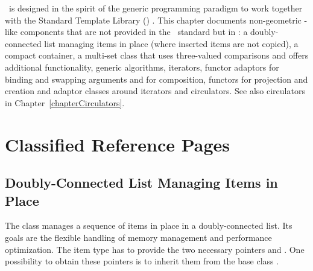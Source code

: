 
\label{chapterDataStructures}\label{chapterStlExtensions}





\cgal\ is designed in the spirit of the generic programming paradigm
to work together with the Standard Template Library (\stl)
\cite{cgal:ansi-is14882-98,cgal:a-gps-98}. This chapter documents non-geometric
\stl-like components that are not provided in the \stl\ standard but
in \cgal: a doubly-connected list managing items in place (where
inserted items are not copied), a compact container, a multi-set class that
uses three-valued comparisons and offers additional functionality,
generic algorithms, iterators, functor adaptors for binding and swapping
arguments and for composition, functors for projection and creation and
adaptor classes around iterators and circulators. See also circulators in
Chapter~\ref{chapterCirculators}.

\section{Classified Reference Pages}

\subsection*{Doubly-Connected List Managing Items in Place}

The class  manages a
sequence of items in place in a doubly-connected list. Its goals are
the flexible handling of memory management and performance
optimization. The item type has to provide the two necessary
pointers  and . One possibility
to obtain these pointers is to inherit them from the base class
.

